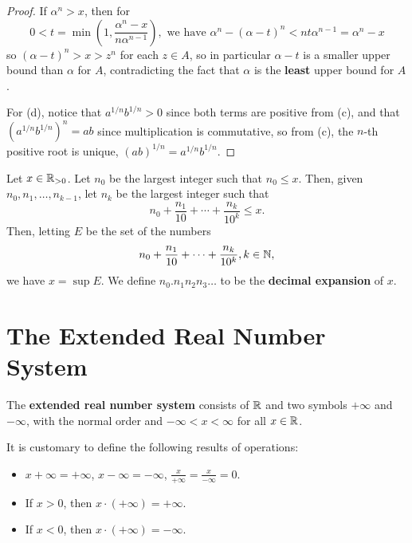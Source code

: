 \begin{theorem}
\begin{proof}
If $\alpha^n > x$, then for
\[
	0 < t = \min\left(1, \frac{\alpha^n - x}{n\alpha^{n - 1}}\right), \text{ we have } \alpha^n - (\alpha - t)^n < nt\alpha^{n-1} = \alpha^n - x
\]
so $(\alpha - t)^n > x > z^n$ for each $z \in A$, so in particular $\alpha - t$ is a smaller upper bound than $\alpha$ for $A$, contradicting the fact that $\alpha$ is the \textbf{least} upper bound for $A$. 

For (d), notice that $a^{1/n}b^{1/n} > 0$ since both terms are positive from (c), and that $(a^{1/n}b^{1/n})^n = ab$ since multiplication is commutative, so from (c), the $n$-th positive root is unique, $(ab)^{1/n} = a^{1/n}b^{1/n}$. 
\end{proof}
\end{theorem}

\begin{definition}
Let $x \in \mathbb{R}_{>0}$. Let $n_0$ be the largest integer such that $n_0 \le x$. Then, given $n_0, n_1, \dotsc, n_{k-1}$, let $n_k$ be the largest integer such that 
\[
	n_0 + \frac{n_1}{10} + \dotsb + \frac{n_k}{10^k} \le x.
\]
Then, letting $E$ be the set of the numbers
\[
	n_0 + \frac{n_1}{10} + \dotsb + \frac{n_k}{10^k}, k \in \mathbb{N},
\]
we have $x = \sup E$. We define $n_0.n_1n_2n_3\dots$ to be the \textbf{decimal expansion} of $x$.
\end{definition}

\section{The Extended Real Number System}
\begin{definition}
The \textbf{extended real number system} consists of $\mathbb{R}$ and two symbols $+\infty$ and $-\infty$, with the normal order and $-\infty < x < \infty$ for all $x \in \mathbb{R}$. 

It is customary to define the following results of operations:
\begin{itemize}
\item $x + \infty = +\infty$, $x - \infty = -\infty$, $\frac{x}{+\infty} = \frac{x}{-\infty} = 0$.
\item If $x > 0$, then $x \cdot (+\infty) = +\infty$.
\item If $x < 0$, then $x \cdot (+\infty) = -\infty$. 
\end{itemize}
\end{definition}

